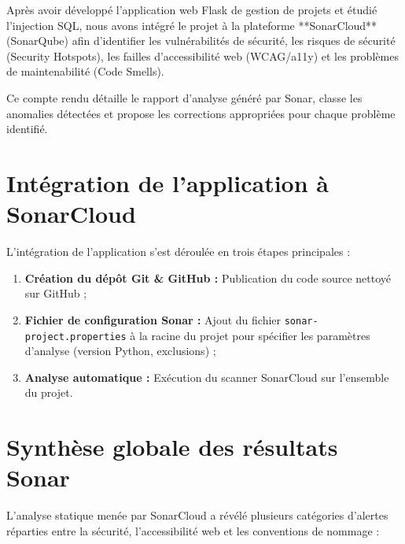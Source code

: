 \documentclass[12pt,a4paper]{article}
\begin{document}
Après avoir développé l'application web Flask de gestion de projets et étudié l'injection SQL, nous avons intégré le projet à la plateforme **SonarCloud** (SonarQube) afin d'identifier les vulnérabilités de sécurité, les risques de sécurité (Security Hotspots), les failles d'accessibilité web (WCAG/a11y) et les problèmes de maintenabilité (Code Smells).

Ce compte rendu détaille le rapport d'analyse généré par Sonar, classe les anomalies détectées et propose les corrections appropriées pour chaque problème identifié.

\section{Intégration de l'application à SonarCloud}
L'intégration de l'application s'est déroulée en trois étapes principales :
\begin{enumerate}
    \item \textbf{Création du dépôt Git \& GitHub :} Publication du code source nettoyé sur GitHub ;
    \item \textbf{Fichier de configuration Sonar :} Ajout du fichier \texttt{sonar-project.properties} à la racine du projet pour spécifier les paramètres d'analyse (version Python, exclusions) ;
    \item \textbf{Analyse automatique :} Exécution du scanner SonarCloud sur l'ensemble du projet.
\end{enumerate}

\section{Synthèse globale des résultats Sonar}
L'analyse statique menée par SonarCloud a révélé plusieurs catégories d'alertes réparties entre la sécurité, l'accessibilité web et les conventions de nommage :
\end{document}
